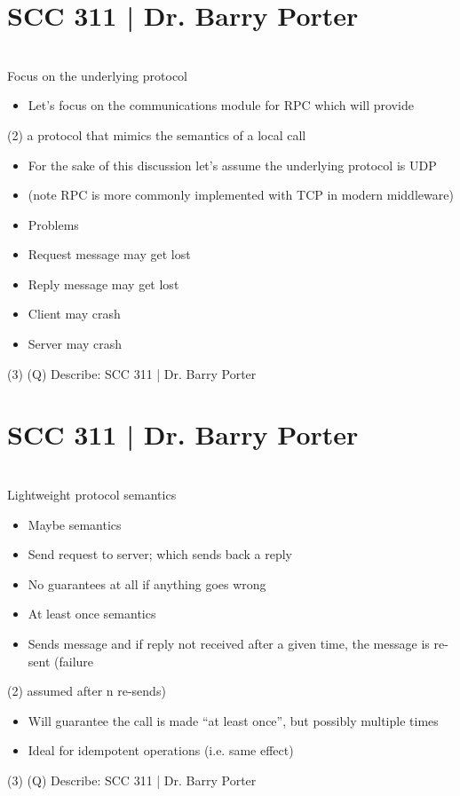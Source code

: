 \documentclass[12pt]{article}
\begin{document}
\section{SCC 311 | Dr. Barry Porter}
\\
Focus on the underlying protocol\\
\begin{itemize}
  \item Let's focus on the communications module for RPC which will provide 
\end{itemize}(2)
a protocol that mimics the semantics of a local call\\
\begin{itemize}
  \item For the sake of this discussion let's assume the underlying protocol is UDP
  \item (note RPC is more commonly implemented with TCP in modern middleware)
  \item Problems
  \item Request message may get lost
  \item Reply message may get lost
  \item Client may crash
  \item Server may crash
\end{itemize}(3)
\clearpage
(Q)
Describe: SCC 311 | Dr. Barry Porter
\clearpage
\section{SCC 311 | Dr. Barry Porter}
\\
Lightweight protocol semantics\\
\begin{itemize}
  \item Maybe semantics
  \item Send request to server; which sends back a reply
  \item No guarantees at all if anything goes wrong
  \item At least once semantics
  \item Sends message and if reply not received after a given time, the message is re-sent (failure 
\end{itemize}(2)
assumed after n re-sends)\\
\begin{itemize}
  \item Will guarantee the call is made “at least once”, but possibly multiple times
  \item Ideal for idempotent operations (i.e. same effect)
\end{itemize}(3)
\clearpage
(Q)
Describe: SCC 311 | Dr. Barry Porter
\clearpage
\end{document}
